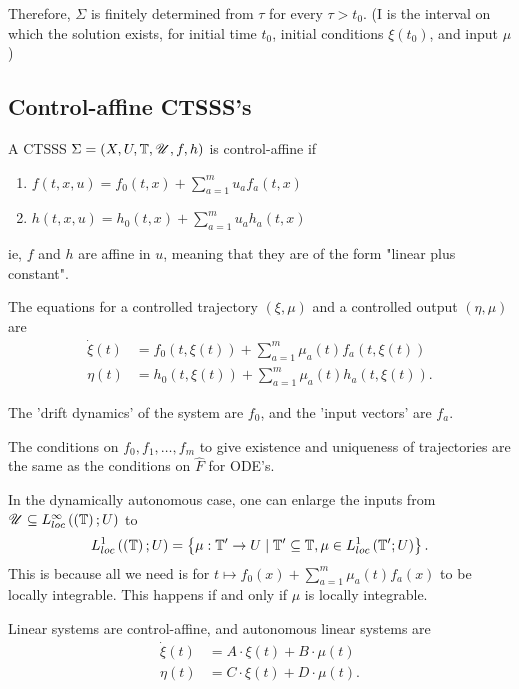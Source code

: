 Therefore, $\Sigma$ is finitely determined from  $\tau$ for every $\tau > t_0$. (I is the interval on which the solution exists, for initial time $t_0$, initial conditions $\xi\left( t_0 \right) $, and input $\mu$)

\subsection{Control-affine CTSSS's}

\begin{definition}
	A CTSSS $\Sigma = \left( X, U, \mathbb{T}, \mathscr{U} , f, h \right) $ is control-affine if 
	\begin{enumerate}
		\item $f\left( t, x, u \right) = f_0 \left( t, x \right) + \sum_{a = 1}^{m} u _a f_a \left( t, x \right)  $
		\item $h\left( t, x, u \right) = h_0 \left( t, x  \right) + \sum_{a=1}^{m} u_{a}h_{a}\left( t, x \right) $
	\end{enumerate}
	ie, $f$ and $h$ are affine in $u$, meaning that they are of the form "linear plus constant".
\end{definition}

The equations for a controlled trajectory $\left( \xi, \mu \right) $ and a controlled output $\left( \eta, \mu \right) $ are 
\begin{align*}
	\dot{\xi}\left( t \right)  &=  f_0 \left( t, \xi\left( t \right)  \right) + \sum_{a=1}^{m} \mu_{a}\left( t \right) f_{a}\left( t, \xi\left( t \right)  \right)  \\
	\eta\left( t \right) &= h_0 \left( t, \xi\left( t \right)  \right)  + \sum_{a=1}^{m} \mu_{a}\left( t \right) h_{a}\left( t, \xi\left( t \right)  \right) 
.\end{align*}

The 'drift dynamics' of the system are  $f_0$, and the 'input vectors' are $f_a$. 

The conditions on $f_0, f_{1} , \ldots , f_{m}$ to give existence and uniqueness of trajectories are the same as the conditions on $\hat{F}$ for ODE's.

In the dynamically autonomous case, one can enlarge the inputs from $\mathscr{U} \subseteq L ^{\infty} _{loc}\left( \left( \mathbb{T} \right) ; U \right) $ to 
\[
L^{1}_{loc}\left( \left( \mathbb{T} \right) ; U \right)  = \left\{ \mu : \mathbb{T}' \to U  \mid \mathbb{T}' \subseteq \mathbb{T}, \mu \in  L^{1}_{loc}\left( \mathbb{T}' ; U \right)  \right\} 
.\] 
This is because all we need is for $t \longmapsto f_0 \left( x  \right) + \sum_{a=1}^{m} \mu_{a}\left( t \right) f_{a}\left( x \right) $ to be locally integrable. This happens if and only if $\mu $ is locally integrable.
\begin{note}
	Linear systems are control-affine, and autonomous linear systems are 
	\begin{align*}
		\dot{\xi}\left( t \right)  &= A \cdot \xi\left( t \right)  + B \cdot \mu\left( t \right) \\
		\eta\left( t \right) &= C\cdot \xi\left( t \right) + D \cdot \mu \left( t \right) 
	.\end{align*}
\end{note}


